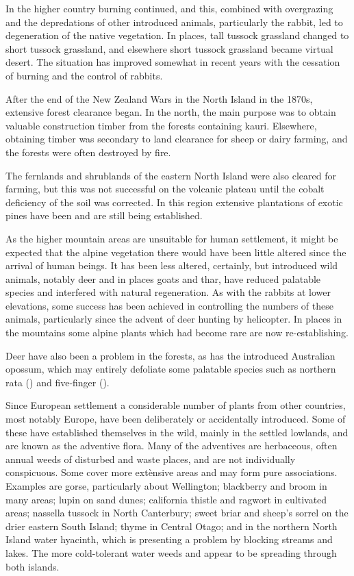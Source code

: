 In the higher country burning continued, and this, combined with overgrazing and the depredations of other introduced animals, particularly the rabbit, led to degeneration of the native vegetation.
In places, tall tussock grassland changed to short tussock grassland, and elsewhere short tussock grassland became virtual desert.
The situation has improved somewhat in recent years with the cessation of burning and the control of rabbits.

After the end of the New Zealand Wars in the North Island in the 1870s, extensive forest clearance began.
In the north, the main purpose was to obtain valuable construction timber from the forests containing kauri.
Elsewhere, obtaining timber was secondary to land clearance for sheep or dairy farming, and the forests were often destroyed by fire.

The fernlands and shrublands of the eastern North Island were also cleared for farming, but this was not successful on the volcanic plateau until the cobalt deficiency of the soil was corrected.
In this region extensive plantations of exotic pines have been and are still being established.

As the higher mountain areas are unsuitable for human settlement, it might be expected that the alpine vegetation there would have been little altered since the arrival of human beings.
It has been less altered, certainly, but introduced wild animals, notably deer and in places goats and thar, have reduced palatable species and interfered with natural regeneration.
As with the rabbits at lower elevations, some success has been achieved in controlling the numbers of these animals, particularly since the advent of deer hunting by helicopter.
In places in the mountains some alpine plants which had become rare are now re-establishing.

Deer have also been a problem in the forests, as has the introduced Australian opossum, which may entirely defoliate some palatable species such as northern rata () and five-finger ().

Since European settlement a considerable number of plants from other countries, most notably Europe, have been deliberately or accidentally introduced.
Some of these have established themselves in the wild, mainly in the settled lowlands, and are known as the adventive flora.
Many of the adventives are herbaceous, often annual weeds of disturbed and waste places, and are not individually conspicuous.
Some cover more extènsive areas and may form pure associations.
Examples are gorse, particularly about Wellington; blackberry and broom in many areas; lupin on sand dunes; california thistle and ragwort in cultivated areas; nassella tussock in North Canterbury; sweet briar and sheep's sorrel on the drier eastern South Island; thyme in Central Otago; and in the northern North Island water hyacinth, which is presenting a problem by blocking streams and lakes.
The more cold-tolerant water weeds  and  appear to be spreading through both islands.

